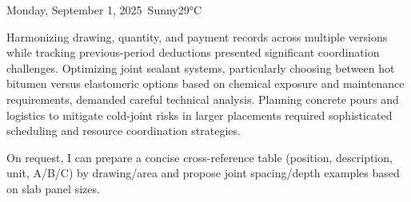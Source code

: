 \begin{dailyentry}{Monday, September 1, 2025}{\weathersunny\ Sunny}{29°C}
\begin{challenges}
\item[] Harmonizing drawing, quantity, and payment records across multiple versions while tracking previous-period deductions presented significant coordination challenges. Optimizing joint sealant systems, particularly choosing between hot bitumen versus elastomeric options based on chemical exposure and maintenance requirements, demanded careful technical analysis. Planning concrete pours and logistics to mitigate cold-joint risks in larger placements required sophisticated scheduling and resource coordination strategies.
\end{challenges}

\begin{dailynotes}
On request, I can prepare a concise cross-reference table (position, description, unit, A/B/C) by drawing/area and propose joint spacing/depth examples based on slab panel sizes.
\end{dailynotes}

\begin{approvalsection}
\end{approvalsection}

\end{dailyentry}
